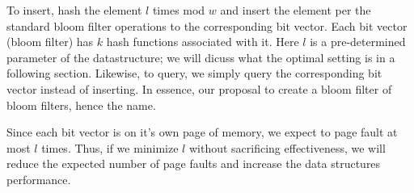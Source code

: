 To insert, hash the element $l$ times mod $w$ and insert the element per the standard bloom filter operations to the corresponding bit vector.
Each bit vector (bloom filter) has $k$ hash functions associated with it.
Here $l$ is a pre-determined parameter of the datastructure; we will dicuss what the optimal setting is in a following section.
Likewise, to query, we simply query the corresponding bit vector instead of inserting.
In essence, our proposal to create a bloom filter of bloom filters, hence the name.

Since each bit vector is on it's own page of memory, we expect to page fault at most $l$ times.
 Thus, if we minimize $l$ without sacrificing effectiveness, we will reduce the expected number of page faults and increase the data structures performance.